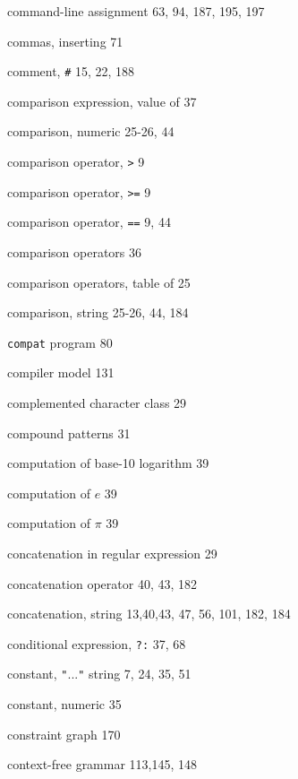 \begin{multicols}{3}
\hangindent=4pc  command-line assignment 63, 94, 187, 195, 197

\hangindent=4pc  commas, inserting 71

\hangindent=4pc  comment, \verb'#' 15, 22, 188

\hangindent=4pc  comparison expression, value of 37

\hangindent=4pc  comparison, numeric 25-26, 44

\hangindent=4pc  comparison operator, \verb'>' 9

\hangindent=4pc  comparison operator, \verb'>=' 9

\hangindent=4pc  comparison operator, \verb'==' 9, 44

\hangindent=4pc  comparison operators 36

\hangindent=4pc  comparison operators, table of 25

\hangindent=4pc  comparison, string 25-26, 44, 184

\hangindent=4pc  \verb'compat' program 80

\hangindent=4pc  compiler model 131

\hangindent=4pc  complemented character class 29

\hangindent=4pc  compound patterns 31

\hangindent=4pc  computation of base-10 logarithm 39

\hangindent=4pc  computation of $e$ 39

\hangindent=4pc  computation of $\pi$ 39

\hangindent=4pc  concatenation in regular expression 29

\hangindent=4pc  concatenation operator 40, 43, 182

\hangindent=4pc  concatenation, string 13,40,43, 47, 56, 101, 182, 184

\hangindent=4pc  conditional expression, \verb'?:' 37, 68

\hangindent=4pc  constant, \verb'"'...\verb'"' string 7, 24, 35, 51

\hangindent=4pc  constant, numeric 35

\hangindent=4pc  constraint graph 170

\hangindent=4pc  context-free grammar 113,145, 148


\end{multicols}
